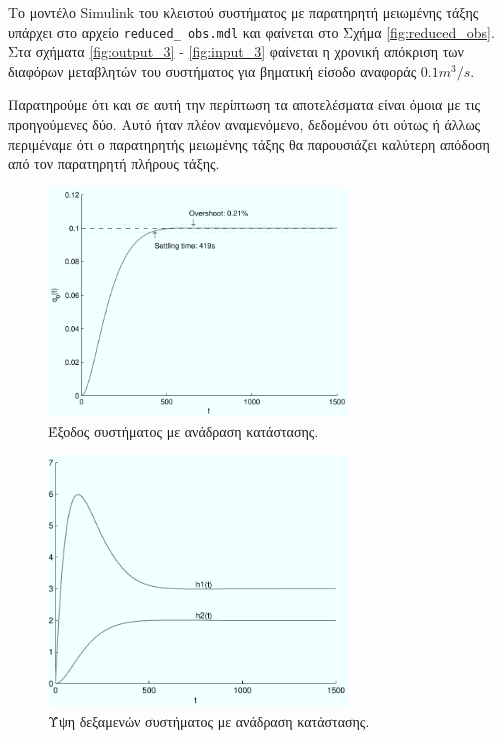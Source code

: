\documentclass[a4paper, 11pt, english, greek]{article}
\begin{document}
Το μοντέλο \textlatin{Simulink} του κλειστού συστήματος με παρατηρητή μειωμένης τάξης υπάρχει στο αρχείο
\textlatin{\texttt{reduced\_ obs.mdl}} και φαίνεται στο Σχήμα \ref{fig:reduced_obs}.
Στα σχήματα \ref{fig:output_3} - \ref{fig:input_3} φαίνεται η χρονική απόκριση των διαφόρων μεταβλητών του
συστήματος για βηματική είσοδο αναφοράς $0.1 m^3/s$.

Παρατηρούμε ότι και σε αυτή την περίπτωση τα αποτελέσματα είναι όμοια με τις προηγούμενες δύο.
Αυτό ήταν πλέον αναμενόμενο, δεδομένου ότι ούτως ή άλλως περιμέναμε ότι ο παρατηρητής μειωμένης τάξης
θα παρουσιάζει καλύτερη απόδοση από τον παρατηρητή πλήρους τάξης.

\begin{figure}[htb]
  \centering
  \includegraphics[width=300px]{output_1}
  \caption{Έξοδος συστήματος με ανάδραση κατάστασης.}
  \label{fig:output_1}
\end{figure}

\begin{figure}[htb]
  \centering
  \includegraphics[width=300px]{heights_1}
  \caption{Ύψη δεξαμενών συστήματος με ανάδραση κατάστασης.}
  \label{fig:heights_1}
\end{figure}
\end{document}
